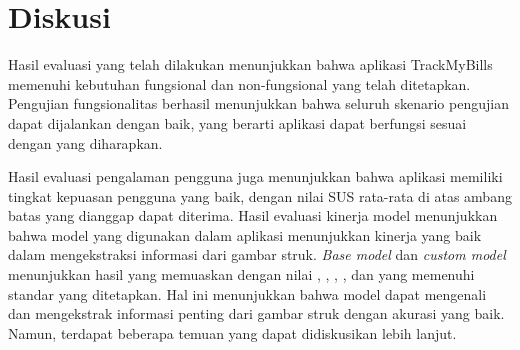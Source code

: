 \section{Diskusi}
\label{sec:diskusi}

Hasil evaluasi yang telah dilakukan menunjukkan bahwa aplikasi TrackMyBills memenuhi kebutuhan fungsional dan non-fungsional yang telah ditetapkan. Pengujian fungsionalitas berhasil menunjukkan bahwa seluruh skenario pengujian dapat dijalankan dengan baik, yang berarti aplikasi dapat berfungsi sesuai dengan yang diharapkan. 

Hasil evaluasi pengalaman pengguna juga menunjukkan bahwa aplikasi memiliki tingkat kepuasan pengguna yang baik, dengan nilai SUS rata-rata di atas ambang batas yang dianggap dapat diterima. Hasil evaluasi kinerja model menunjukkan bahwa model yang digunakan dalam aplikasi menunjukkan kinerja yang baik dalam mengekstraksi informasi dari gambar struk. \emph{Base model} dan \emph{custom model} menunjukkan hasil yang memuaskan dengan nilai \accuracy, \precision, \recall, \fscore, dan \mcer{} yang memenuhi standar yang ditetapkan. Hal ini menunjukkan bahwa model dapat mengenali dan mengekstrak informasi penting dari gambar struk dengan akurasi yang baik. Namun, terdapat beberapa temuan yang dapat didiskusikan lebih lanjut.





